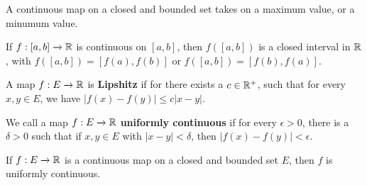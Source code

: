 \begin{theorem}\label{thm_4.34}
    A continuous map on a closed and bounded set takes on a maximum value, or a
    minumum value.
\end{theorem}

\begin{theorem}\label{thm_4.35}
    If $f:[a,b] \xrightarrow{} \mathbb{R}$ is continuous on $[a,b]$, then $f([a,b])$ is
    a closed interval in $\mathbb{R}$, with  $f([a,b])=[f(a),f(b)]$ or
    $f([a,b])=[f(b),f(a)]$.
\end{theorem}

\begin{definition}
    A map $f:E \xrightarrow{} \mathbb{R}$ is \textbf{Lipshitz} if for there exists a $c
    \in \mathbb{R}^+$, such that for every $x,y \in E$, we have  $|f(x)-f(y)| \leq
    c|x-y|$.
\end{definition}

\begin{definition}
    We call a map $f:E \xrightarrow{} \mathbb{R}$ \textbf{uniformly continuous} if for
    every $\epsilon>0$, there is a  $\delta>0$ such that if  $x,y \in E$ with
    $|x-y|<\delta$, then  $|f(x)-f(y)|<\epsilon$.
\end{definition}

\begin{theorem}\label{thm_4.36}
    If $f:E \xrightarrow{} \mathbb{R}$ is a continuous map on a closed and bounded set
    $E$, then  $f$ is uniformly continuous.
\end{theorem}
